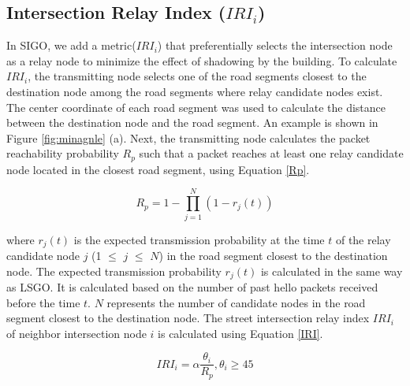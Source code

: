 \documentclass{comex}
\begin{document}

 
\subsection{Intersection Relay Index ($IRI_i$)}

In SIGO,  we add a metric($IRI_i$) that preferentially selects the intersection node as a relay node to minimize the effect of shadowing by the building. To calculate $IRI_i$, the transmitting node selects one of the road segments closest to the destination node among the road segments where relay candidate nodes exist. The center coordinate of each road segment was used to calculate the distance between the destination node and the road segment. 
An example is shown in Figure \ref{fig:minagnle} (a). 
Next, the transmitting node calculates the packet reachability probability $R_p$ such that a packet reaches at least one relay candidate node located in the closest road segment, using Equation \ref{Rp}.

\begin{equation}
\label{Rp}
R_{p} = 1 - \prod_{j=1}^N (1 - r_{j}(t))
\end{equation}

where $r_j(t)$ is the expected transmission probability at the time $t$ of the relay candidate node $j$ (1 $\leq$  $j$ $\leq$ $N$) in the road segment closest to the destination node. 
The expected transmission probability $r_j (t)$ is calculated in the same way as LSGO.
 It is calculated based on the number of past hello packets received before the time $t$.
$N$ represents the number of candidate nodes in the road segment closest to the destination node. 
The street intersection relay  index $IRI_i$ of neighbor intersection node $i$ is calculated using Equation \ref{IRI}.

\begin{equation}
\label{IRI}
IRI_i =  \alpha\frac{\theta_i}{R_p}, \theta_i \geq 45
\end{equation}
\end{document}
